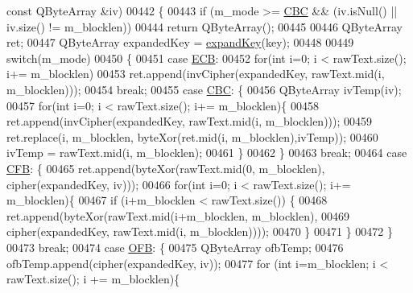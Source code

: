 \begin{DoxyCode}
{      const} QByteArray &iv)
00442 \{
00443     \textcolor{keywordflow}{if} (m\_mode >= \hyperlink{class_q_a_e_s_encryption_ad3e031c49a3d56566379d75b40b7b255a559bffc55d3599d0a172cc85aed98966}{CBC} && (iv.isNull() || iv.size() != m\_blocklen))
00444        \textcolor{keywordflow}{return} QByteArray();
00445 
00446     QByteArray ret;
00447     QByteArray expandedKey = \hyperlink{class_q_a_e_s_encryption_a5bfbb972f84a8376fceed648553c0912}{expandKey}(key);
00448 
00449     \textcolor{keywordflow}{switch}(m\_mode)
00450     \{
00451     \textcolor{keywordflow}{case} \hyperlink{class_q_a_e_s_encryption_ad3e031c49a3d56566379d75b40b7b255a4ca7f51778e2adf1f464164a0ba8e75e}{ECB}:
00452         \textcolor{keywordflow}{for}(\textcolor{keywordtype}{int} i=0; i < rawText.size(); i+= m\_blocklen)
00453             ret.append(invCipher(expandedKey, rawText.mid(i, m\_blocklen)));
00454         \textcolor{keywordflow}{break};
00455     \textcolor{keywordflow}{case} \hyperlink{class_q_a_e_s_encryption_ad3e031c49a3d56566379d75b40b7b255a559bffc55d3599d0a172cc85aed98966}{CBC}: \{
00456             QByteArray ivTemp(iv);
00457             \textcolor{keywordflow}{for}(\textcolor{keywordtype}{int} i=0; i < rawText.size(); i+= m\_blocklen)\{
00458                 ret.append(invCipher(expandedKey, rawText.mid(i, m\_blocklen)));
00459                 ret.replace(i, m\_blocklen, byteXor(ret.mid(i, m\_blocklen),ivTemp));
00460                 ivTemp = rawText.mid(i, m\_blocklen);
00461             \}
00462         \}
00463         \textcolor{keywordflow}{break};
00464     \textcolor{keywordflow}{case} \hyperlink{class_q_a_e_s_encryption_ad3e031c49a3d56566379d75b40b7b255ae5e2e019df35c7d172fcd7f0ebec5e8e}{CFB}: \{
00465             ret.append(byteXor(rawText.mid(0, m\_blocklen), cipher(expandedKey, iv)));
00466             \textcolor{keywordflow}{for}(\textcolor{keywordtype}{int} i=0; i < rawText.size(); i+= m\_blocklen)\{
00467                 \textcolor{keywordflow}{if} (i+m\_blocklen < rawText.size()) \{
00468                     ret.append(byteXor(rawText.mid(i+m\_blocklen, m\_blocklen),
00469                                        cipher(expandedKey, rawText.mid(i, m\_blocklen))));
00470                 \}
00471             \}
00472         \}
00473         \textcolor{keywordflow}{break};
00474     \textcolor{keywordflow}{case} \hyperlink{class_q_a_e_s_encryption_ad3e031c49a3d56566379d75b40b7b255a27e2f82decd94080893d61db4a8adcb3}{OFB}: \{
00475         QByteArray ofbTemp;
00476         ofbTemp.append(cipher(expandedKey, iv));
00477         \textcolor{keywordflow}{for} (\textcolor{keywordtype}{int} i=m\_blocklen; i < rawText.size(); i += m\_blocklen)\{

\end{DoxyCode}
